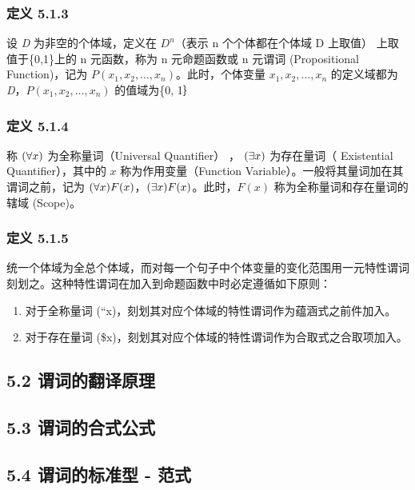 \subsubsection{定义 5.1.3}\label{ux5b9aux4e49-5.1.3}

设 \emph{D} 为非空的个体域，定义在 \(D^n\)（表示 n 个个体都在个体域 D
上取值） 上取值于\{0,1\}上的 n 元函数，称为 n 元命题函数或 n 元谓词
(Propositional Function)，记为 \(P(x_1, x_2, …, x_n)\)。此时，个体变量
\(x_1, x_2, …, x_n\) 的定义域都为 \emph{D}，\(P(x_1, x_2, …, x_n)\)
的值域为\{0, 1｝

\subsubsection{定义 5.1.4}\label{ux5b9aux4e49-5.1.4}

称 \((\large \forall x)\) 为全称量词（Universal Quantifier） ，
\((\large \exists x)\) 为存在量词（ Existential Quantifier），其中的
\(x\) 称为作用变量（Function
Variable）。一般将其量词加在其谓词之前，记为
\((\large \forall x)F(x)\)，\((\large \exists x)F(x)\)。此时，\(F(x)\)
称为全称量词和存在量词的辖域 (Scope)。

\subsubsection{定义 5.1.5}\label{ux5b9aux4e49-5.1.5}

统一个体域为全总个体域，而对每一个句子中个体变量的变化范围用一元特性谓词刻划之。这种特性谓词在加入到命题函数中时必定遵循如下原则：

\begin{enumerate}
\def\labelenumi{\arabic{enumi})}
\tightlist
\item
  对于全称量词 (``x)，刻划其对应个体域的特性谓词作为蕴涵式之前件加入。
\item
  对于存在量词 (\$x)，刻划其对应个体域的特性谓词作为合取式之合取项加入。
\end{enumerate}

\subsection{5.2
谓词的翻译原理}\label{ux8c13ux8bcdux7684ux7ffbux8bd1ux539fux7406}

\subsection{5.3
谓词的合式公式}\label{ux8c13ux8bcdux7684ux5408ux5f0fux516cux5f0f}

\subsection{5.4 谓词的标准型 -
范式}\label{ux8c13ux8bcdux7684ux6807ux51c6ux578b---ux8303ux5f0f}
